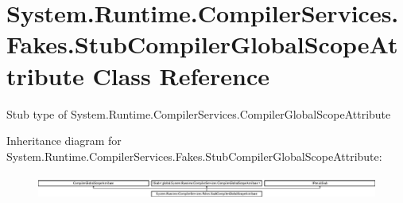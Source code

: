 \hypertarget{class_system_1_1_runtime_1_1_compiler_services_1_1_fakes_1_1_stub_compiler_global_scope_attribute}{\section{System.\-Runtime.\-Compiler\-Services.\-Fakes.\-Stub\-Compiler\-Global\-Scope\-Attribute Class Reference}
\label{class_system_1_1_runtime_1_1_compiler_services_1_1_fakes_1_1_stub_compiler_global_scope_attribute}
}


Stub type of System.\-Runtime.\-Compiler\-Services.\-Compiler\-Global\-Scope\-Attribute 


Inheritance diagram for System.\-Runtime.\-Compiler\-Services.\-Fakes.\-Stub\-Compiler\-Global\-Scope\-Attribute\-:\begin{figure}[H]
\begin{center}
\leavevmode
\includegraphics[height=0.785965cm]{class_system_1_1_runtime_1_1_compiler_services_1_1_fakes_1_1_stub_compiler_global_scope_attribute}
\end{center}
\end{figure}
